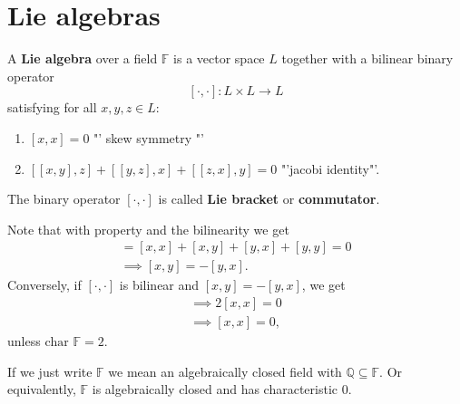 \chapter{Lie algebras}
\newcommand{\F}{\mathbb{F}}
\newcommand{\Q}{\mathbb{Q}}
\newcommand{\liebracket}{[\cdot,\cdot]}
\newcommand{\End}{\textrm{End}}
\newcommand{\gl}{\mathfrak{gl}}
\newcommand{\GL}{\textrm{GL}}
\begin{definition}
    A \textbf{Lie algebra} over a field $\F$ 
    is a vector space $L$ together with a bilinear binary operator 
    $$ \liebracket : L \times L \to L $$ satisfying for all $x,y,z \in L$:
    \begin{enumerate}[label=(\arabic*)]
        \item $[x,x] = 0$ "' skew symmetry "'\label{item:skew}
        \item $[[x,y],z] + [[y,z],x] + [[z,x],y] = 0$ "'jacobi identity"'.
    \end{enumerate}

    The binary operator $\liebracket$ is called \textbf{Lie bracket} or \textbf{commutator}.
\end{definition}

\begin{remark}
    Note that with property  and the bilinearity we get
    \begin{align*}
        [(x+y),(x+y)] = [x,x] + [x,y] + [y,x] + [y,y] = 0 \\
        \implies [x,y] = -[y,x].
    \end{align*}
    Conversely, if $\liebracket$ is bilinear and $[x,y] = -[y,x]$, we get
    \begin{align*}
        \implies 2 [x,x] = 0\\
        \implies [x,x] = 0,
    \end{align*}
    unless $\textrm{char } \F = 2$.
\end{remark}

\begin{notation}
    If we just write $\F$ we mean an algebraically closed field with $\Q \subseteq \F$.
    Or equivalently, $\F$ is algebraically closed and has characteristic $0$.
\end{notation}

